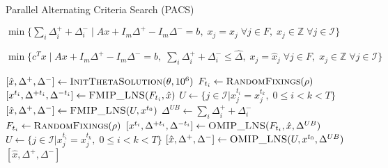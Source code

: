 \begin{algorithm}[h]
\caption{Parallel Alternating Criteria Search (PACS)}\label{alg:PACS}
\begin{algorithmic}
    \State \Return $\min\{\sum_i \Delta^+_i + \Delta^-_i \mid A x + I_m \Delta^+ - I_m \Delta^- = b, \; x_j = \hat{x}_j \; \forall j \in F, \; x_j \in \mathbb{Z} \; \forall j \in \mathcal{I}\}$
\EndFunction
\end{algorithmic}
\vspace{1em}
\begin{algorithmic}
    \State \Return $\min\{c^T x \mid A x + I_m \Delta^+ - I_m \Delta^- = b, \; \sum_i \Delta^+_i + \Delta^-_i \leq \hat{\Delta}, \; x_j = \hat{x}_j \; \forall j \in F, \; x_j \in \mathbb{Z} \; \forall j \in \mathcal{I}\}$
\EndFunction
\end{algorithmic}
\vspace{1em}
\begin{algorithmic}[1]
\State $[\hat{x}, \Delta^+, \Delta^-] \gets \Call{InitThetaSolution}{\theta,10^6}$
            \State $F_{t_i} \gets \Call{RandomFixings}{\rho}$
            \State $[x^{t_i}, \Delta^{+t_i}, \Delta^{-t_i}] \gets \Call{FMIP\_LNS}{F_{t_i}, \hat{x}}$
        \EndFor
        \State $U \gets \{ j \in \mathcal{I} | x^{t_i}_j = x^{t_k}_j, \; 0 \leq i < k < T\}$
        \State $[\hat{x}, \Delta^+, \Delta^-] \gets \Call{FMIP\_LNS}{U, x^{t_0}}$
    \EndIf
    \State $\Delta^{UB} \gets \sum_i \Delta^+_i + \Delta^-_i$
            \State $F_{t_i} \gets \Call{RandomFixings}{\rho}$
            \State $[x^{t_i}, \Delta^{+t_i}, \Delta^{-t_i}] \gets \Call{OMIP\_LNS}{F_{t_i}, \hat{x}, \Delta^{UB}}$
    \EndFor
    \State $U \gets \{ j \in \mathcal{I} | x^{t_i}_j = x^{t_k}_j, \; 0 \leq i < k < T\}$
    \State $[\hat{x}, \Delta^+, \Delta^-] \gets \Call{OMIP\_LNS}{U, x^{t_0}, \Delta^{UB}}$
\EndWhile
\State \Return $[\hat{x}, \Delta^+, \Delta^-]$
\EndFunction
\end{algorithmic}
\end{algorithm}
